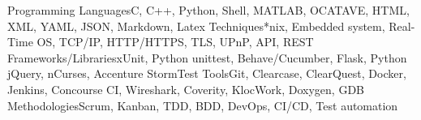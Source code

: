 \begin{cvskills}
  \cvskill
    {Programming Languages}{C, C++, Python, Shell, MATLAB, OCATAVE, HTML, XML, YAML, JSON, Markdown, Latex}
  \cvskill
    {Techniques}{*nix, Embedded system, Real-Time OS, TCP/IP, HTTP/HTTPS, TLS, UPnP, API, REST}
  \cvskill
    {Frameworks/Libraries}{xUnit, Python unittest, Behave/Cucumber, Flask, Python jQuery, nCurses, Accenture StormTest}
  \cvskill
    {Tools}{Git, Clearcase, ClearQuest, Docker, Jenkins, Concourse CI, Wireshark, Coverity, KlocWork, Doxygen, GDB}
  \cvskill
    {Methodologies}{Scrum, Kanban, TDD, BDD, DevOps, CI/CD, Test automation}
\end{cvskills}
